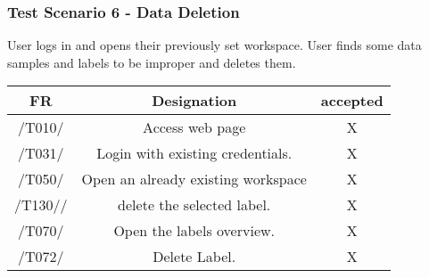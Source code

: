 \subsubsection{Test Scenario 6 - Data Deletion}
User logs in and opens their previously set workspace. User finds some data samples and
labels to be improper and deletes them.
\begin{table}[h]
\begin{tabular}{!{\VRule}c!{\VRule}c!{\VRule}c!{\VRule}}
\hline
FR     & Designation                                                                    &accepted                \\
\hline
  /T010/ &  Access web page &   X  \\
 \hline
 /T031/  &  Login with existing credentials. &   X  \\
 \hline
 /T050/  &  Open an already existing workspace &   X  \\
 \hline
  /T130//  &  delete the selected label. &   X  \\
 \hline
  /T070/   &  Open the labels overview. &   X  \\
 \hline
 /T072/   &  Delete Label. &   X  \\
 \hline
\end{tabular}
\end{table}
